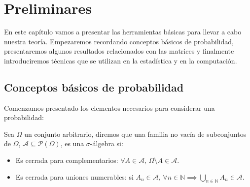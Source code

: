 \chapter{Preliminares}

En este capítulo vamos a presentar las herramientas básicas para llevar a cabo nuestra teoría. Empezaremos recordando conceptos básicos de probabilidad, presentaremos algunos resultados relacionados con las matrices y finalmente introduciremos técnicas que se utilizan en la estadística y en la computación.

\section{Conceptos básicos de probabilidad}
Comenzamos presentado los elementos necesarios para considerar una probabilidad:
\begin{definition}
    Sea $\Omega$ un conjunto arbitrario, diremos que una familia no vacía de subconjuntos de $\Omega$, $\mathcal{A}\subseteq\mathcal{P}(\Omega)$, es una $\sigma$-álgebra si:
    \begin{itemize}
        \item Es cerrada para complementarios: $\forall A\in\mathcal{A},\, \Omega\setminus A\in\mathcal{A}.$
        \item Es cerrada para uniones numerables: si $A_{n}\in\mathcal{A}, \,\forall n\in\mathbb{N}  \implies \displaystyle\bigcup_{n\in\mathbb{N}}A_n\in\mathcal{A}.$
    \end{itemize}
\end{definition}

